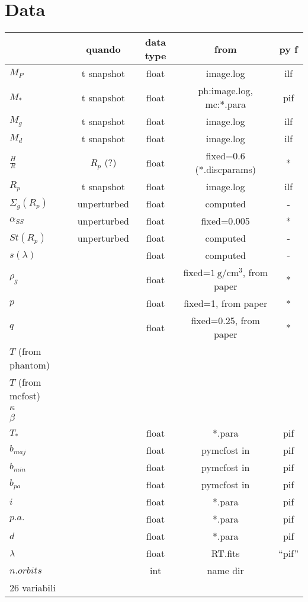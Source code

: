\documentclass[DIN, pagenumber=false, fontsize=11pt, parskip=half]{scrartcl}
\begin{document}
\section{Data}
\begin{center}
\begin{tabular}{l | c c c c}
\toprule
  & quando & data type & from & py f\\
\midrule       
 $M_P$ & t snapshot & float & image.log & ilf \\ 
 $M_*$ & t snapshot & float & ph:image.log, mc:*.para & pif\\
 $M_g$ & t snapshot & float & image.log & ilf\\
 $M_d$ & t snapshot & float & image.log & ilf \\
 $\frac  HR$ & $R_p$ (?) & float & fixed=0.6 (*.discparams) & *\\
 $R_p$ & t snapshot & float & image.log & ilf \\
 $\Sigma_g(R_p)$ &unperturbed & float & computed  & -\\
 $\alpha_{SS}$ & unperturbed & float & fixed=0.005 & * \\
 $St(R_p)$ & unperturbed &float & computed & - \\
 $s(\lambda)$ &  & float & computed & -\\
 $\rho_g$ & & float & fixed=$\SI{1}{\g\per\cubic\cm}$, from paper & *\\
 $p$ & & float & fixed=1, from paper & *\\
 $q$ & & float & fixed=0.25, from paper & *\\
 $T$ (from phantom) & \\
 $T$ (from mcfost) & \\
 $\kappa$ & \\
 $\beta$ & \\
 $T_*$ & & float & *.para & pif\\
 $b_{maj}$ & &float & pymcfost in & pif\\
 $b_{min}$ & & float & pymcfost in & pif\\
 $b_{pa}$ & & float & pymcfost in & pif\\
 $i$ & & float & *.para & pif\\
 $p.a.$ & & float & *.para & pif\\
 $d$ & & float & *.para & pif\\
 $\lambda$ & & float & RT.fits & ``pif''\\
 $n.orbits$ & & int & name dir\\
 \bottomrule
 26 variabili & \\
\end{tabular}
\end{center}
\end{document}
